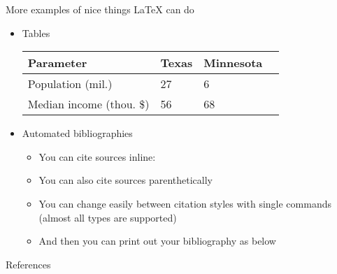 \documentclass[capfont, final]{beamer}\usepackage[]{graphicx}\usepackage[]{color}
\newlength{\sepwid}
\newlength{\onecolwid}
\begin{document}
\begin{frame}[t, fragile]
\begin{columns}[T]
\begin{column}{\onecolwid}
\begin{block}{More examples of nice things \LaTeX{} can do}
\begin{itemize}
									\vspace{0.25em}
									\begin{equation}
											\nabla \mathbf{f} = \frac{\partial\mathbf{f}}{\partial x}\mathbf{\hat{i}} + \frac{\partial\mathbf{f}}{\partial y}\mathbf{\hat{j}} + \frac{\partial\mathbf{f}}{\partial z}\mathbf{\hat{k}}
									\end{equation}
									\begin{equation}
											f(\zeta) = \int_{-\infty}^{\infty}f(x)e^{-2\pi i x \zeta} dx
									\end{equation}
							\item Tables
									\vspace{0.25em}	
									\begin{table}
									\small
									\centering
									\begin{tabular}{llll}
									\toprule
									\textbf{Parameter} & \textbf{Texas} & \textbf{Minnesota} \\
									\midrule
									Population (mil.) & 27 & 6 \\
									Median income (thou. \$) & 56 & 68\\
									\bottomrule
									\end{tabular}
									\end{table}
									\vspace{0.25em}
							\item Automated bibliographies
									\begin{itemize}
										\item You can cite sources inline: \textcite{Ashmore1991} 
										\item You can also cite sources parenthetically \autocite{Shamma2000, Dreyer2006}
										\item You can change easily between citation styles with single commands (almost all types are supported)
										\item And then you can print out your bibliography as below
									\end{itemize}
					\end{itemize}
				\end{block}
				\begin{block}{References}
							\renewcommand*{\bibfont}{\footnotesize}
							\nocite{*}	
							\printbibliography
				\end{block}
		\end{column} %
		\begin{column}{\sepwid}\end{column} %
	\end{columns} %
\end{frame}
\end{document}
